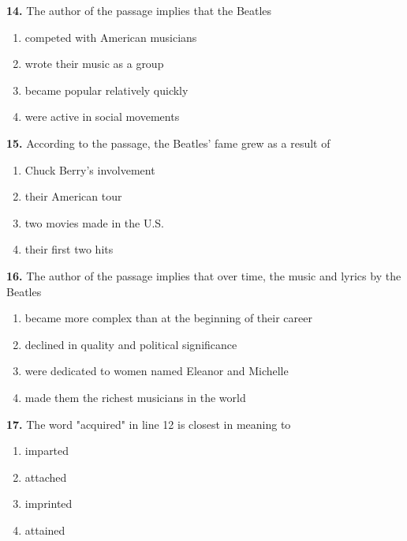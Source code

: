 \documentclass[12pt]{article}
\begin{document}
\par
\vspace{0.25\baselineskip}
\noindent\textbf{14.} The author of the passage implies that the Beatles
\begin{enumerate}[label=(\Alph*),leftmargin=*,itemsep=0.2em]
\item competed with American musicians
\item wrote their music as a group
\item became popular relatively quickly
\item were active in social movements
\end{enumerate}
\par
\vspace{0.25\baselineskip}
\noindent\textbf{15.} According to the passage, the Beatles' fame grew as a result of
\begin{enumerate}[label=(\Alph*),leftmargin=*,itemsep=0.2em]
\item Chuck Berry's involvement
\item their American tour
\item two movies made in the U.S.
\item their first two hits
\end{enumerate}
\par
\vspace{0.25\baselineskip}
\noindent\textbf{16.} The author of the passage implies that over time, the music and lyrics by the Beatles
\begin{enumerate}[label=(\Alph*),leftmargin=*,itemsep=0.2em]
\item became more complex than at the beginning of their career
\item declined in quality and political significance
\item were dedicated to women named Eleanor and Michelle
\item made them the richest musicians in the world
\end{enumerate}
\par
\vspace{0.25\baselineskip}
\noindent\textbf{17.} The word "acquired" in line 12 is closest in meaning to
\begin{enumerate}[label=(\Alph*),leftmargin=*,itemsep=0.2em]
\item imparted
\item attached
\item imprinted
\item attained
\end{enumerate}
\end{document}
